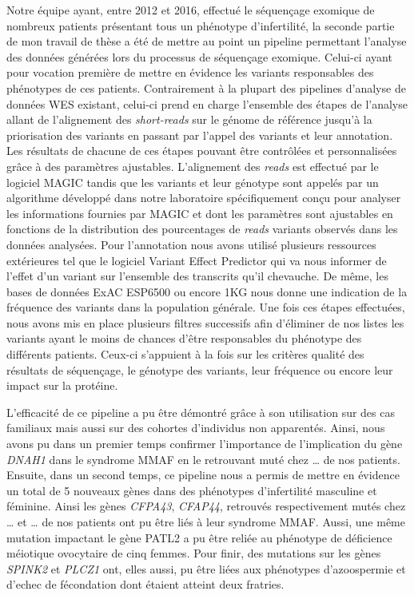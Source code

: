 \documentclass[12pt,twoside]{ugathesis}
\begin{document}
Notre équipe ayant, entre 2012 et 2016, effectué le séquençage exomique
de nombreux patients présentant tous un phénotype d'infertilité, la
seconde partie de mon travail de thèse a été de mettre au point un
pipeline permettant l'analyse des données générées lors du processus de
séquençage exomique. Celui-ci ayant pour vocation première de mettre en
évidence les variants responsables des phénotypes de ces patients.
Contrairement à la plupart des pipelines d'analyse de données WES
existant, celui-ci prend en charge l'ensemble des étapes de l'analyse
allant de l'alignement des \emph{short-reads} sur le génome de référence
jusqu'à la priorisation des variants en passant par l'appel des variants
et leur annotation. Les résultats de chacune de ces étapes pouvant être
contrôlées et personnalisées grâce à des paramètres ajustables.
L'alignement des \emph{reads} est effectué par le logiciel MAGIC tandis
que les variants et leur génotype sont appelés par un algorithme
développé dans notre laboratoire spécifiquement conçu pour analyser les
informations fournies par MAGIC et dont les paramètres sont ajustables
en fonctions de la distribution des pourcentages de \emph{reads}
variants observés dans les données analysées. Pour l'annotation nous
avons utilisé plusieurs ressources extérieures tel que le logiciel
Variant Effect Predictor qui va nous informer de l'effet d'un variant
sur l'ensemble des transcrits qu'il chevauche. De même, les bases de
données ExAC ESP6500 ou encore 1KG nous donne une indication de la
fréquence des variants dans la population générale. Une fois ces étapes
effectuées, nous avons mis en place plusieurs filtres successifs afin
d'éliminer de nos listes les variants ayant le moins de chances d'être
responsables du phénotype des différents patients. Ceux-ci s'appuient à
la fois sur les critères qualité des résultats de séquençage, le
génotype des variants, leur fréquence ou encore leur impact sur la
protéine.

L'efficacité de ce pipeline a pu être démontré grâce à son utilisation
sur des cas familiaux mais aussi sur des cohortes d'individus non
apparentés. Ainsi, nous avons pu dans un premier temps confirmer
l'importance de l'implication du gène \emph{DNAH1} dans le syndrome MMAF
en le retrouvant muté chez \ldots{} de nos patients. Ensuite, dans un
second temps, ce pipeline nous a permis de mettre en évidence un total
de 5 nouveaux gènes dans des phénotypes d'infertilité masculine et
féminine. Ainsi les gènes \emph{CFPA43}, \emph{CFAP44}, retrouvés
respectivement mutés chez \ldots{} et \ldots{} de nos patients ont pu
être liés à leur syndrome MMAF. Aussi, une même mutation impactant le
gène PATL2 a pu être reliée au phénotype de déficience méiotique
ovocytaire de cinq femmes. Pour finir, des mutations sur les gènes
\emph{SPINK2} et \emph{PLCZ1} ont, elles aussi, pu être liées aux
phénotypes d'azoospermie et d'echec de fécondation dont étaient atteint
deux fratries.
\end{document}
